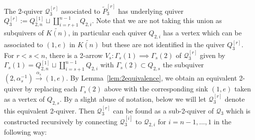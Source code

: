 \documentclass[smallextended,envcountsect,envcountsame]{svjour3}
\numberwithin{equation}{section}
\newcommand{\cQ}{\mathcal{Q}}
\begin{document}
The 2-quiver $\cQ_3^{[r]}$ associated to $\tilde P_3^{[r]}$ has underlying quiver $Q_3^{[r]}:=Q_{2,n}^{[1]}\sqcup\coprod\limits_{i=r+1}^{n-1} Q_{2,i}$.
Note that we are not taking this union as subquivers of $\widetilde{K(n)}$, in particular each quiver $Q_{2,i}$ has a vertex which can be associated to $(1,e)$ in $\widetilde{K(n)}$ but these are not identified in the quiver $Q_3^{[r]}$. 
For $r<s<n$, there is a 2-arrow $V_s:\Gamma_s(1)\implies\Gamma_s(2)$ of $\cQ_3^{[r]}$ given by $\Gamma_s(1)=Q_{2,n}^{[1]}\sqcup\coprod\limits_{i=s+1}^{n-1} Q_{2,i}$ with $\Gamma_s(2)\subset Q_{2,s}$ the subquiver $(2,\alpha_s^{-1})\xrightarrow{\alpha_s} (1,e)$.
By Lemma~\ref{lem:2equivalence}, we obtain an equivalent 2-quiver by replacing each $\Gamma_s(2)$ above with the corresponding sink $(1,e)$ taken as a vertex of $Q_{2,s}$.
By a slight abuse of notation, below we will let $\cQ_3^{[r]}$ denote this equivalent 2-quiver.
Then $\cQ_3^{[r]}$ can be found as a sub-2-quiver of $\cQ_3$ which is constructed recursively by connecting $\cQ_3^{[i]}$ to $\cQ_{2,i}$ for $i=n-1,\ldots, 1$ in the following way: \bigskip
\end{document}
